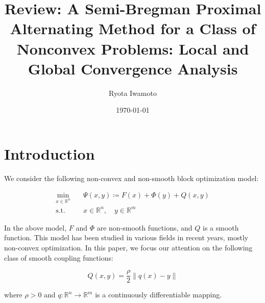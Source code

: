 \documentclass[a4paper,11pt]{jsarticle}
\theoremstyle{definition}
\newcommand{\RealNumberSet}{\mathbb{R}}
\newcommand{\NDemenstionalRealEuclideanSpace}{\mathbb{R}^n}
\newcommand{\Norm}[1]{\left\lVert {#1} \right\rVert} %
\begin{document}
\title{%
  Review: A Semi-Bregman Proximal Alternating Method for a Class of Nonconvex Problems: Local and Global Convergence Analysis}
\author{Ryota Iwamoto}
\date{\today}
\maketitle

\section{Introduction}

We consider the following non-convex and non-smooth block optimization model:

\begin{equation}
  \begin{aligned}
    \min_{x \in \RealNumberSet^n} & \quad \Psi(x,y) \coloneqq  F(x) + \Phi(y) + Q(x,y)                         \\
    \text{s.t.}                   & \quad x \in \NDemenstionalRealEuclideanSpace, \quad y \in \RealNumberSet^m
  \end{aligned}
\end{equation}

In the above model, $F$ and $\Phi$ are non-smooth functions, and $Q$ is a smooth function.
This model has been studied in various fields in recent years, mostly non-convex optimization.
In this paper, we focus our attention on the following class of smooth coupling functions:

\begin{equation}
  Q(x,y) = \frac{\rho}{2} \Norm{q(x) - y}
\end{equation}

where $\rho > 0$ and $q \colon \NDemenstionalRealEuclideanSpace \to \RealNumberSet^m$ is
a continuously differentiable mapping.
\end{document}
